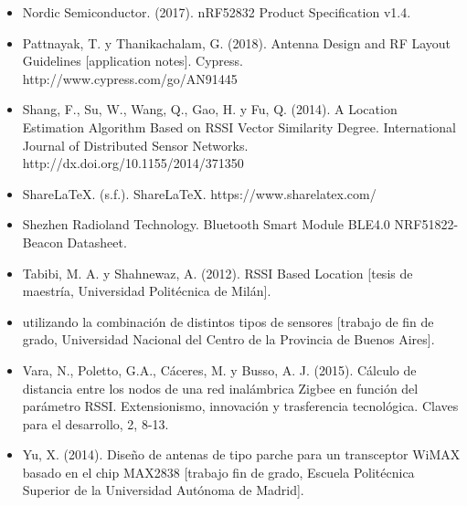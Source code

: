 \documentclass[paper=a4, fontsize=11pt,twoside]{scrartcl}	%
\begin{document}
\begin{itemize}
        \item Nordic Semiconductor. (2017). nRF52832 Product Specification v1.4.
        \item Pattnayak, T. y Thanikachalam, G. (2018). Antenna Design and RF Layout Guidelines [application notes]. Cypress. http://www.cypress.com/go/AN91445 
        \item Shang, F., Su, W., Wang, Q., Gao, H. y Fu, Q. (2014). A Location Estimation Algorithm Based on RSSI Vector Similarity Degree. International Journal of Distributed Sensor Networks. http://dx.doi.org/10.1155/2014/371350 
        \item ShareLaTeX. (s.f.). ShareLaTeX. https://www.sharelatex.com/ 
        \item Shezhen Radioland Technology. Bluetooth Smart Module BLE4.0 NRF51822-Beacon Datasheet.
        \item Tabibi, M. A. y Shahnewaz, A. (2012). RSSI Based Location [tesis de maestría, Universidad Politécnica de Milán].
        \item utilizando la combinación de distintos tipos de sensores [trabajo de fin de grado, Universidad Nacional del Centro de la Provincia de Buenos Aires].
        \item Vara, N., Poletto, G.A., Cáceres, M. y Busso, A. J. (2015). Cálculo de distancia entre los nodos de una red inalámbrica Zigbee en función del parámetro RSSI. Extensionismo, innovación y trasferencia tecnológica. Claves para el desarrollo, 2, 8-13.
        \item Yu, X. (2014). Diseño de antenas de tipo parche para un transceptor WiMAX basado en el chip MAX2838 [trabajo fin de grado, Escuela Politécnica Superior de la Universidad Autónoma de Madrid].
    \end{itemize}
\end{document}
